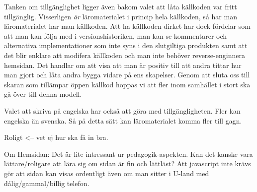 \begin{binge}
Tanken om tillgänglighet ligger även bakom valet att låta källkoden var fritt
tillgänglig. Visserligen \textit{är} läromaterialet i princip hela källkoden, så
har man läromaterialet har man källkoden. Att ha källkoden dirket har dock
fördelar som att man kan följa med i versionshistoriken, man kan se kommentarer
och alternativa implementationer som inte syns i den slutgiltiga produkten samt
att det blir enklare att modifera källkoden och man inte behöver
reverse-enginnera hemsidan. Det handlar om att visa att man är positiv till att
andra tittar hur man gjort och låta andra bygga vidare på ens skapelser. Genom
att sluta oss till skaran som tillämpar öppen källkod hoppas vi att fler inom
samhället i stort ska gå över till denna modell.

Valet att skriva på engelska har också att göra med tillgängligheten. Fler kan
engelska än svenska. Så på detta sätt kan läromaterialet komma fler till gagn.

Roligt <-- vet ej hur ska få in bra.

Om Hemsidan:
  Det är lite intressant ur pedagogik-aspekten. Kan det
  kanske vara lättare/roligare att lära sig om sidan är fin och
  lättläst? Att javascript inte krävs gör att sidan kan visas ordentligt
  även om man sitter i U-land med dålig/gammal/billig telefon.

\end{binge}
